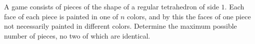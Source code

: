 A game consists of pieces of the shape of a regular tetrahedron of side $1$. Each face of each piece is painted in one of $n$ colors, and by this the faces of one piece not necessarily painted in different colors. Determine the maximum possible number of pieces, no two of which are identical.
